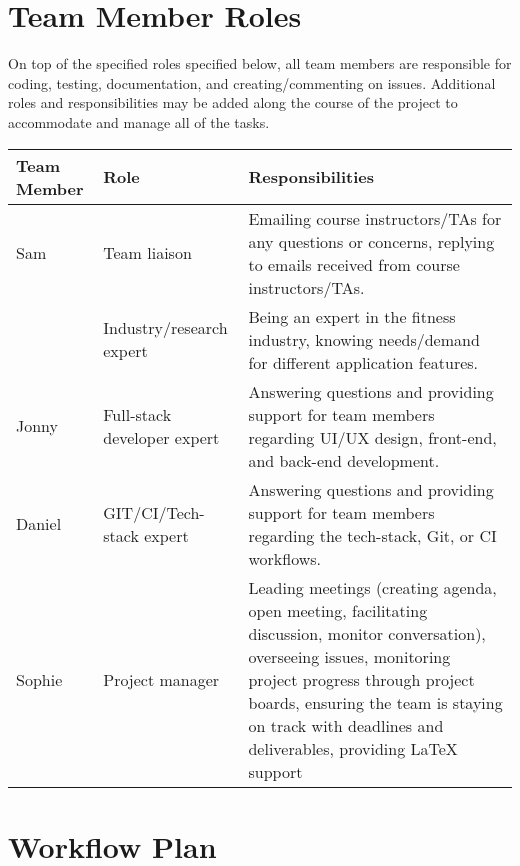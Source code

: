 \documentclass{article}
\begin{document}
	\section{Team Member Roles}

	On top of the specified roles specified below, all team members are responsible for coding, testing, documentation, and creating/commenting on issues. Additional roles and responsibilities may be added along the course of the project to accommodate and manage all of the tasks.

	\vspace{0.5cm}
	\begin{tabularx}{\textwidth}{|l|l|X|}
		\hline
		\textbf{Team Member} & \textbf{Role} & \textbf{Responsibilities} \\
		\hline
		Sam & Team liaison & Emailing course instructors/TAs for any questions or concerns, replying to emails received from course instructors/TAs.\\
        \cline{2-3}
         & Industry/research expert & Being an expert in the fitness industry, knowing needs/demand for different application features. \\
		\hline
		Jonny & Full-stack developer expert & Answering questions and providing support for team members regarding UI/UX design, front-end, and back-end development. \\
		\hline
		Daniel & GIT/CI/Tech-stack expert & Answering questions and providing support for team members regarding the tech-stack, Git, or CI workflows. \\
		\hline
		Sophie & Project manager & Leading meetings (creating agenda, open meeting, facilitating discussion, monitor conversation), overseeing issues, monitoring project progress through project boards, ensuring the team is staying on track with deadlines and deliverables, providing LaTeX support\\
		\hline
	\end{tabularx}

	\section{Workflow Plan}
\end{document}
